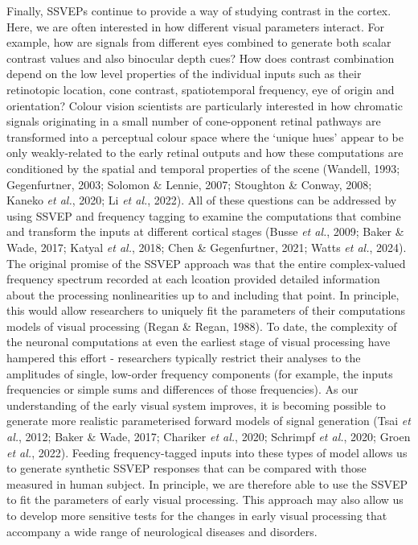 \documentclass[
  letterpaper,
  DIV=11,
  numbers=noendperiod]{scrartcl}
\begin{document}
Finally, SSVEPs continue to provide a way of studying contrast in the
cortex. Here, we are often interested in how different visual parameters
interact. For example, how are signals from different eyes combined to
generate both scalar contrast values and also binocular depth cues? How
does contrast combination depend on the low level properties of the
individual inputs such as their retinotopic location, cone contrast,
spatiotemporal frequency, eye of origin and orientation? Colour vision
scientists are particularly interested in how chromatic signals
originating in a small number of cone-opponent retinal pathways are
transformed into a perceptual colour space where the `unique hues'
appear to be only weakly-related to the early retinal outputs and how
these computations are conditioned by the spatial and temporal
properties of the scene (Wandell, 1993; Gegenfurtner, 2003; Solomon \&
Lennie, 2007; Stoughton \& Conway, 2008; Kaneko \emph{et al.}, 2020; Li
\emph{et al.}, 2022). All of these questions can be addressed by using
SSVEP and frequency tagging to examine the computations that combine and
transform the inputs at different cortical stages (Busse \emph{et al.},
2009; Baker \& Wade, 2017; Katyal \emph{et al.}, 2018; Chen \&
Gegenfurtner, 2021; Watts \emph{et al.}, 2024). The original promise of
the SSVEP approach was that the entire complex-valued frequency spectrum
recorded at each lcoation provided detailed information about the
processing nonlinearities up to and including that point. In principle,
this would allow researchers to uniquely fit the parameters of their
computations models of visual processing (Regan \& Regan, 1988). To
date, the complexity of the neuronal computations at even the earliest
stage of visual processing have hampered this effort - researchers
typically restrict their analyses to the amplitudes of single, low-order
frequency components (for example, the inputs frequencies or simple sums
and differences of those frequencies). As our understanding of the early
visual system improves, it is becoming possible to generate more
realistic parameterised forward models of signal generation (Tsai
\emph{et al.}, 2012; Baker \& Wade, 2017; Chariker \emph{et al.}, 2020;
Schrimpf \emph{et al.}, 2020; Groen \emph{et al.}, 2022). Feeding
frequency-tagged inputs into these types of model allows us to generate
synthetic SSVEP responses that can be compared with those measured in
human subject. In principle, we are therefore able to use the SSVEP to
fit the parameters of early visual processing. This approach may also
allow us to develop more sensitive tests for the changes in early visual
processing that accompany a wide range of neurological diseases and
disorders.
\end{document}
